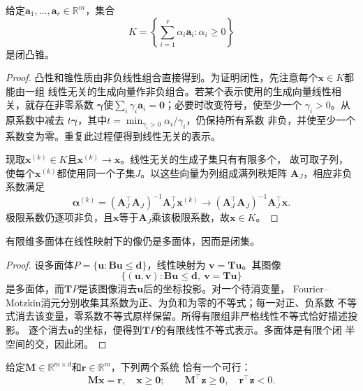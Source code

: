 \begin{lemma}[有限生成锥的闭性]
\label{lem:opt-finitely-generated-cone}
给定$\bm{a}_1,\ldots,\bm{a}_r\in\mathbb{R}^m$，集合
\[
  K=\left\{\sum_{i=1}^r\alpha_i\bm{a}_i:\alpha_i\geq0\right\}
\]
是闭凸锥。
\end{lemma}

\begin{proof}
凸性和锥性质由非负线性组合直接得到。为证明闭性，先注意每个$\bm{x}\in K$都能由一组
线性无关的生成向量作非负组合。若某个表示使用的生成向量线性相关，就存在非零系数
$\bm{\gamma}$使$\sum_i\gamma_i\bm{a}_i=\bm{0}$；必要时改变符号，使至少一个
$\gamma_i>0$。从原系数中减去
$t\bm{\gamma}$，其中$t=\min_{\gamma_i>0}\alpha_i/\gamma_i$，仍保持所有系数
非负，并使至少一个系数变为零。重复此过程便得到线性无关的表示。

现取$\bm{x}^{(k)}\in K$且$\bm{x}^{(k)}\to\bm{x}$。线性无关的生成子集只有有限多个，
故可取子列，使每个$\bm{x}^{(k)}$都使用同一个子集$J$。以这些向量为列组成满列秩矩阵
$\bm{A}_J$，相应非负系数满足
\[
  \bm{\alpha}^{(k)}
  =(\bm{A}_J^{\top}\bm{A}_J)^{-1}\bm{A}_J^{\top}\bm{x}^{(k)}
  \longrightarrow
  (\bm{A}_J^{\top}\bm{A}_J)^{-1}\bm{A}_J^{\top}\bm{x}.
\]
极限系数仍逐项非负，且$\bm{x}$等于$\bm{A}_J$乘该极限系数，故$\bm{x}\in K$。
\end{proof}

\begin{lemma}[有限维多面体的线性像]
\label{lem:opt-polyhedral-image}
有限维多面体在线性映射下的像仍是多面体，因而是闭集。
\end{lemma}

\begin{proof}
设多面体$P=\{\bm{u}:\bm{B}\bm{u}\leq\bm{d}\}$，线性映射为
$\bm{v}=\bm{T}\bm{u}$。其图像
\[
  \{(\bm{u},\bm{v}):\bm{B}\bm{u}\leq\bm{d},\
  \bm{v}=\bm{T}\bm{u}\}
\]
是多面体，而$\bm{T}P$是该图像消去$\bm{u}$后的坐标投影。对一个待消变量，
Fourier--Motzkin消元分别收集其系数为正、为负和为零的不等式；每一对正、负系数
不等式消去该变量，零系数不等式原样保留。所得有限组非严格线性不等式恰好描述投影。
逐个消去$\bm{u}$的坐标，便得到$\bm{T}P$的有限线性不等式表示。多面体是有限个闭
半空间的交，因此闭。
\end{proof}

\begin{theorem}[Farkas择一定理]
\label{thm:opt-farkas}
给定$\bm{M}\in\mathbb{R}^{m\times d}$和$\bm{r}\in\mathbb{R}^m$，下列两个系统
恰有一个可行：
\[
  \bm{M}\bm{x}=\bm{r},\quad\bm{x}\geq\bm{0};
  \qquad
  \bm{M}^{\top}\bm{z}\geq\bm{0},\quad
  \bm{r}^{\top}\bm{z}<0.
\]
\end{theorem}

